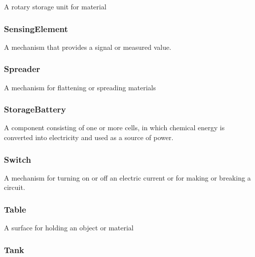 A rotary storage unit for material

\FloatBarrier

\subsubsection{SensingElement}
\label{sec:SensingElement}



A mechanism that provides a signal or measured value.

\FloatBarrier

\subsubsection{Spreader}
\label{sec:Spreader}



A mechanism for flattening or spreading materials

\FloatBarrier

\subsubsection{StorageBattery}
\label{sec:StorageBattery}



A component consisting of one or more cells, in which chemical energy is converted into electricity and used as a source of power. 

\FloatBarrier

\subsubsection{Switch}
\label{sec:Switch}



A mechanism for turning on or off an electric current or for making or breaking a circuit.

\FloatBarrier

\subsubsection{Table}




A surface for holding an object or material

\FloatBarrier

\subsubsection{Tank}
\label{sec:Tank}



